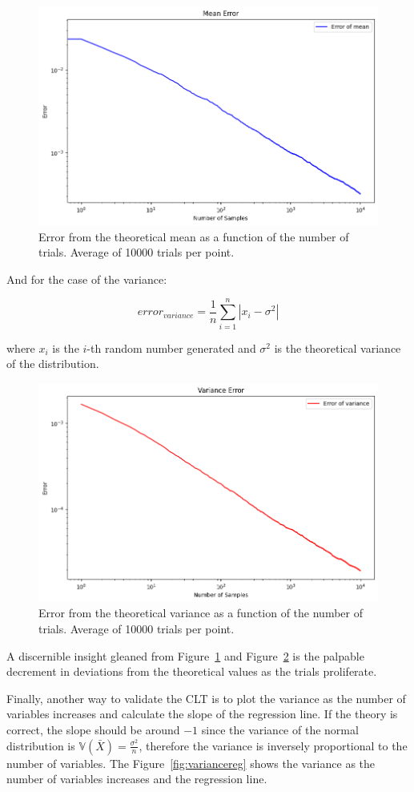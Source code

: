 \documentclass{report}
\begin{document}
\begin{figure}[H]
	\centering
	\includegraphics[width=0.5\linewidth]{./Figures/CLT/meanerror.png}
	\caption{Error from the theoretical mean as a function of the number of trials. Average of 10000 trials per point.}
	\label{fig:meanerror}
\end{figure}

And for the case of the variance:

\begin{equation*} error_{variance} = \frac{1}{n}\sum_{i=1}^{n} | x_i - \sigma^2 | \end{equation*}

where \(x_i\) is the \(i\)-th random number generated and \(\sigma^2\) is the theoretical variance of the distribution.

\begin{figure}[H]
	\centering
	\includegraphics[width=0.5\linewidth]{./Figures/CLT/varianceerror.png}
	\caption{Error from the theoretical variance as a function of the number of trials. Average of 10000 trials per point.}
	\label{fig:varianceerror}
\end{figure}

A discernible insight gleaned from Figure~\ref{fig:meanerror} and Figure~\ref{fig:varianceerror} is the palpable decrement in deviations from the theoretical values as the trials proliferate. 

Finally, another way to validate the CLT is to plot the variance as the number of variables increases and calculate the slope of the regression line. If the theory is correct, the slope should be around \(-1\) since the variance of the normal distribution is \(\mathbb{V}(\bar{X}) = \frac{\sigma^2}{n}\), therefore the variance is inversely proportional to the number of variables. The Figure~\ref{fig:variancereg} shows the variance as the number of variables increases and the regression line.
\end{document}
